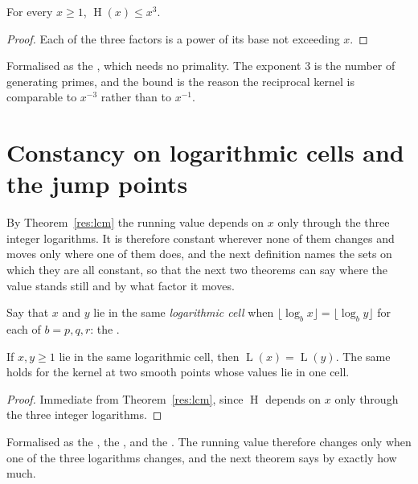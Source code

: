 \documentclass[11pt]{article}
\newcommand{\hgt}{\operatorname{H}}
\newcommand{\Lprefix}{\operatorname{L}}
\begin{document}
\begin{proposition}\label{res:cube}
For every $x\ge1$, $\hgt(x)\le x^{3}$.
\end{proposition}

\begin{proof}
Each of the three factors is a power of its base not exceeding $x$.
\end{proof}

\noindent Formalised as the
, which needs no primality.  The exponent $3$ is the number of
generating primes, and the bound is the reason the reciprocal kernel is
comparable to $x^{-3}$ rather than to $x^{-1}$.

\section{Constancy on logarithmic cells and the jump points}\label{sec:cells}

By Theorem~\ref{res:lcm} the running value depends on $x$ only through the
three integer logarithms.  It is therefore constant wherever none of them
changes and moves only where one of them does, and the next definition names
the sets on which they are all constant, so that the next two theorems can say
where the value stands still and by what factor it moves.

Say that $x$ and $y$ lie in the same \emph{logarithmic cell} when
$\lfloor\log_b x\rfloor=\lfloor\log_b y\rfloor$ for each of $b=p,q,r$: the
.

\begin{theorem}\label{res:cell}
If $x,y\ge1$ lie in the same logarithmic cell, then
$\Lprefix(x)=\Lprefix(y)$.  The same holds for the kernel at two smooth points
whose values lie in one cell.
\end{theorem}

\begin{proof}
Immediate from Theorem~\ref{res:lcm}, since $\hgt$ depends on $x$ only
through the three integer logarithms.
\end{proof}

\noindent Formalised as the
, the
, and the
.  The running value therefore changes only when one of
the three logarithms changes, and the next theorem says by exactly how much.
\end{document}
